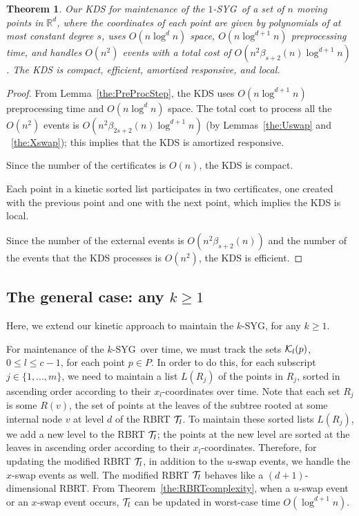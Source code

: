 \documentclass[preprint,12pt]{elsarticle}
\def\ksyg{\mbox{$k$-SYG}}
\def\1syg{\mbox{$1$-SYG}}
\newtheorem{theorem}{Theorem}[section]
\begin{document}
\begin{theorem}\label{the:KineticSYG}
Our KDS for maintenance of the \1syg~of a set of $n$ moving points in $\mathbb{R}^d$, where the coordinates of each point are given by polynomials of at most constant degree $s$, uses $O(n\log^d n)$  space, $O(n\log^{d+1} n)$ preprocessing time, and handles $O(n^2)$ events with a total cost of $O(n^2\beta_{s+2}(n)\log^{d+1} n)$. The KDS is compact, efficient, amortized responsive, and local.
\end{theorem}
\begin{proof}
From Lemma~\ref{the:PreProcStep}, the KDS uses  $O(n\log^{d+1} n)$ preprocessing time and $O(n\log^d n)$  space. The total cost to process all the $O(n^2)$ events is $O(n^2\beta_{2s+2}(n)\log^{d+1} n)$ (by Lemmas~\ref{the:Uswap} and ~\ref{the:Xswap}); this implies that the KDS is amortized responsive. 

Since the number of the certificates is $O(n)$, the KDS is compact. 

Each point in a kinetic sorted list participates in two certificates, one created with the previous point and one with the next point, which implies the KDS is local. 

Since the number of the external events is $O(n^2\beta_{s+2}(n))$ and the number of the events that the KDS processes is $O(n^2)$, the KDS is efficient.
\end{proof}

\subsection{The general case: any $k\geq 1$}\label{sec:KDSforkSYG}
Here, we extend our kinetic approach to maintain the \ksyg, for any $k\geq 1$.

For maintenance of the \ksyg~over time, we must track the sets ${\cal K}_l(p)$, $0\leq l\leq c-1$, for each point $p\in P$. In order to do this, for each subscript $j\in \{1,...,m\}$, we need to maintain a list $L(R_j)$ of the points in $R_j$, sorted in ascending order according to their $x_l$-coordinates over time. Note that each set $R_j$ is some $R(v)$, the set of points at the leaves of the subtree rooted at some internal node $v$ at level $d$ of the RBRT ${\cal T}_l$. To maintain these sorted lists $L(R_j)$, we add a new level to the RBRT ${\cal T}_l$; the points at the new level are sorted at the leaves in ascending order according to their $x_l$-coordinates. Therefore, for updating the modified RBRT ${\cal T}_l$, in addition to the $u$-swap events, we handle the $x$-swap events as well. The modified RBRT ${\cal T}_l$ behaves like a $(d+1)$-dimensional RBRT. From Theorem~\ref{the:RBRTcomplexity}, when a $u$-swap event or an $x$-swap event occurs, ${\cal T}_l$ can be updated in worst-case time $O(\log^{d+1}n)$.
\end{document}
